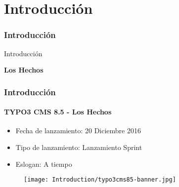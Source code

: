 %

\section{Introducción}
\begin{frame}[fragile]
	\frametitle{Introducción}

	\begin{center}\huge{Introducción}\end{center}
	\begin{center}\huge{\color{typo3darkgrey}\textbf{Los Hechos}}\end{center}

\end{frame}

\begin{frame}[fragile]
	\frametitle{Introducción}
	\framesubtitle{TYPO3 CMS 8.5 - Los Hechos}

	\begin{itemize}
		\item Fecha de lanzamiento: 20 Diciembre 2016
		\item Tipo de lanzamiento: Lanzamiento Sprint
		\item Eslogan: A tiempo
	\end{itemize}

	\begin{figure}
		\texttt{[image: Introduction/typo3cms85-banner.jpg]}
	\end{figure}

\end{frame}

